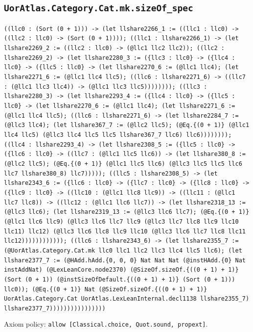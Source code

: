 \documentclass[11pt]{article}
\begin{document}
\subsection*{\texttt{UorAtlas.Category.Cat.mk.sizeOf\_spec}}
\noindent\texttt{((llc0 : (Sort (0 + 1))) -> (let llshare2266\_1 := ((llc1 : llc0) -> ((llc2 : llc0) -> (Sort (0 + 1)))); ((llc1 : llshare2266\_1) -> (let llshare2269\_2 := ((llc2 : llc0) -> (@llc1 llc2 llc2)); ((llc2 : llshare2269\_2) -> (let llshare2280\_3 := (\{llc3 : llc0\} -> (\{llc4 : llc0\} -> (\{llc5 : llc0\} -> (let llshare2270\_6 := (@llc1 llc4); (let llshare2271\_6 := (@llc1 llc4 llc5); ((llc6 : llshare2271\_6) -> ((llc7 : (@llc1 llc3 llc4)) -> (@llc1 llc3 llc5)))))))); ((llc3 : llshare2280\_3) -> (let llshare2293\_4 := (\{llc4 : llc0\} -> (\{llc5 : llc0\} -> (let llshare2270\_6 := (@llc1 llc4); (let llshare2271\_6 := (@llc1 llc4 llc5); ((llc6 : llshare2271\_6) -> (let llshare2284\_7 := (@llc3 llc4); (let llshare367\_7 := (@llc2 llc5); (@Eq.\{(0 + 1)\} (@llc1 llc4 llc5) (@llc3 llc4 llc5 llc5 llshare367\_7 llc6) llc6)))))))); ((llc4 : llshare2293\_4) -> (let llshare2308\_5 := (\{llc5 : llc0\} -> (\{llc6 : llc0\} -> ((llc7 : (@llc1 llc5 llc6)) -> (let llshare380\_8 := (@llc2 llc5); (@Eq.\{(0 + 1)\} (@llc1 llc5 llc6) (@llc3 llc5 llc5 llc6 llc7 llshare380\_8) llc7))))); ((llc5 : llshare2308\_5) -> (let llshare2343\_6 := (\{llc6 : llc0\} -> (\{llc7 : llc0\} -> (\{llc8 : llc0\} -> (\{llc9 : llc0\} -> ((llc10 : (@llc1 llc8 llc9)) -> ((llc11 : (@llc1 llc7 llc8)) -> ((llc12 : (@llc1 llc6 llc7)) -> (let llshare2318\_13 := (@llc3 llc6); (let llshare2319\_13 := (@llc3 llc6 llc7); (@Eq.\{(0 + 1)\} (@llc1 llc6 llc9) (@llc3 llc6 llc7 llc9 (@llc3 llc7 llc8 llc9 llc10 llc11) llc12) (@llc3 llc6 llc8 llc9 llc10 (@llc3 llc6 llc7 llc8 llc11 llc12)))))))))))); ((llc6 : llshare2343\_6) -> (let llshare2355\_7 := (@UorAtlas.Category.Cat.mk llc0 llc1 llc2 llc3 llc4 llc5 llc6); (let llshare2377\_7 := (@HAdd.hAdd.\{0, 0, 0\} Nat Nat Nat (@instHAdd.\{0\} Nat instAddNat) (@LexLeanCore.node2370) (@SizeOf.sizeOf.\{((0 + 1) + 1)\} (Sort (0 + 1)) (@instSizeOfDefault.\{((0 + 1) + 1)\} (Sort (0 + 1))) llc0)); (@Eq.\{(0 + 1)\} Nat (@SizeOf.sizeOf.\{((0 + 1) + 1)\} UorAtlas.Category.Cat UorAtlas.LexLeanInternal.decl1138 llshare2355\_7) llshare2377\_7))))))))))))))))}\par
\noindent Axiom policy: \texttt{allow [Classical.choice, Quot.sound, propext]}.\par
\end{document}
